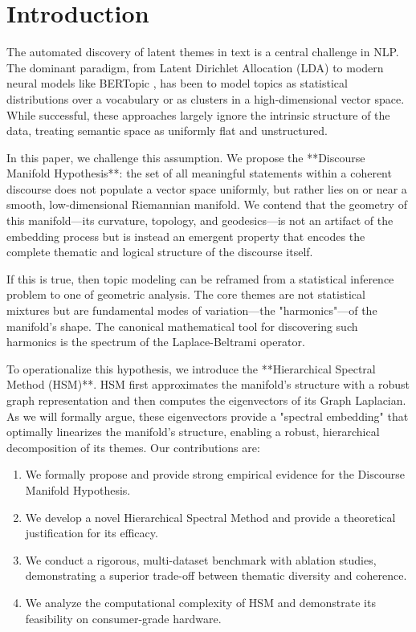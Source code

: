\documentclass[conference]{IEEEtran}
\begin{document}
\section{Introduction}
The automated discovery of latent themes in text is a central challenge in NLP. The dominant paradigm, from Latent Dirichlet Allocation (LDA) \cite{blei2003latent} to modern neural models like BERTopic \cite{grootendorst2022bertopic}, has been to model topics as statistical distributions over a vocabulary or as clusters in a high-dimensional vector space. While successful, these approaches largely ignore the intrinsic structure of the data, treating semantic space as uniformly flat and unstructured.

In this paper, we challenge this assumption. We propose the **Discourse Manifold Hypothesis**: the set of all meaningful statements within a coherent discourse does not populate a vector space uniformly, but rather lies on or near a smooth, low-dimensional Riemannian manifold. We contend that the geometry of this manifold—its curvature, topology, and geodesics—is not an artifact of the embedding process but is instead an emergent property that encodes the complete thematic and logical structure of the discourse itself.

If this is true, then topic modeling can be reframed from a statistical inference problem to one of geometric analysis. The core themes are not statistical mixtures but are fundamental modes of variation—the "harmonics"—of the manifold's shape. The canonical mathematical tool for discovering such harmonics is the spectrum of the Laplace-Beltrami operator.

To operationalize this hypothesis, we introduce the **Hierarchical Spectral Method (HSM)**. HSM first approximates the manifold's structure with a robust graph representation and then computes the eigenvectors of its Graph Laplacian. As we will formally argue, these eigenvectors provide a "spectral embedding" that optimally linearizes the manifold's structure, enabling a robust, hierarchical decomposition of its themes. Our contributions are:
\begin{enumerate}
    \item We formally propose and provide strong empirical evidence for the Discourse Manifold Hypothesis.
    \item We develop a novel Hierarchical Spectral Method and provide a theoretical justification for its efficacy.
    \item We conduct a rigorous, multi-dataset benchmark with ablation studies, demonstrating a superior trade-off between thematic diversity and coherence.
    \item We analyze the computational complexity of HSM and demonstrate its feasibility on consumer-grade hardware.
\end{enumerate}
\end{document}
